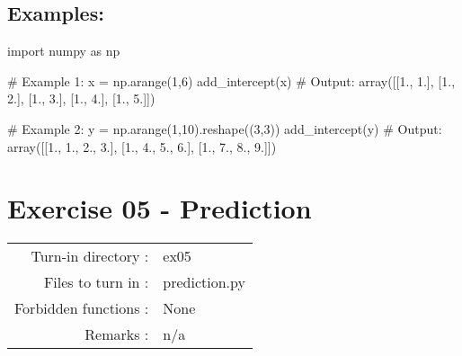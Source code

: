 \documentclass[]{article}
\newenvironment{Shaded}{\begin{snugshade}}{\end{snugshade}}
\newcommand{\CommentTok}[1]{\textcolor[rgb]{0.48,0.49,0.49}{#1}}
\newcommand{\DecValTok}[1]{\textcolor[rgb]{0.96,0.45,0.00}{#1}}
\newcommand{\FloatTok}[1]{\textcolor[rgb]{0.96,0.45,0.00}{#1}}
\newcommand{\ImportTok}[1]{\textcolor[rgb]{0.15,0.68,0.38}{#1}}
\newcommand{\NormalTok}[1]{\textcolor[rgb]{0.81,0.81,0.76}{#1}}
\newcommand{\OperatorTok}[1]{\textcolor[rgb]{0.81,0.81,0.76}{#1}}
\begin{document}
\hypertarget{examples-2}{%
\subsection{Examples:}\label{examples-2}}

\begin{Shaded}
\begin{Highlighting}[]
\ImportTok{import}\NormalTok{ numpy }\ImportTok{as}\NormalTok{ np}

\CommentTok{# Example 1:}
\NormalTok{x }\OperatorTok{=}\NormalTok{ np.arange(}\DecValTok{1}\NormalTok{,}\DecValTok{6}\NormalTok{)}
\NormalTok{add_intercept(x)}
\CommentTok{# Output:}
\NormalTok{array([[}\FloatTok{1.}\NormalTok{, }\FloatTok{1.}\NormalTok{],}
\NormalTok{       [}\FloatTok{1.}\NormalTok{, }\FloatTok{2.}\NormalTok{],}
\NormalTok{       [}\FloatTok{1.}\NormalTok{, }\FloatTok{3.}\NormalTok{],}
\NormalTok{       [}\FloatTok{1.}\NormalTok{, }\FloatTok{4.}\NormalTok{],}
\NormalTok{       [}\FloatTok{1.}\NormalTok{, }\FloatTok{5.}\NormalTok{]])}


\CommentTok{# Example 2:}
\NormalTok{y }\OperatorTok{=}\NormalTok{ np.arange(}\DecValTok{1}\NormalTok{,}\DecValTok{10}\NormalTok{).reshape((}\DecValTok{3}\NormalTok{,}\DecValTok{3}\NormalTok{))}
\NormalTok{add_intercept(y)}
\CommentTok{# Output:}
\NormalTok{array([[}\FloatTok{1.}\NormalTok{, }\FloatTok{1.}\NormalTok{, }\FloatTok{2.}\NormalTok{, }\FloatTok{3.}\NormalTok{],}
\NormalTok{       [}\FloatTok{1.}\NormalTok{, }\FloatTok{4.}\NormalTok{, }\FloatTok{5.}\NormalTok{, }\FloatTok{6.}\NormalTok{],}
\NormalTok{       [}\FloatTok{1.}\NormalTok{, }\FloatTok{7.}\NormalTok{, }\FloatTok{8.}\NormalTok{, }\FloatTok{9.}\NormalTok{]])}
\end{Highlighting}
\end{Shaded}

\clearpage

\hypertarget{exercise-05---prediction-1}{%
\section{Exercise 05 - Prediction}\label{exercise-05---prediction-1}}

\begin{longtable}[]{@{}rl@{}}
\toprule
\endhead
Turn-in directory : & ex05\tabularnewline
Files to turn in : & prediction.py\tabularnewline
Forbidden functions : & None\tabularnewline
Remarks : & n/a\tabularnewline
\bottomrule
\end{longtable}
\end{document}
